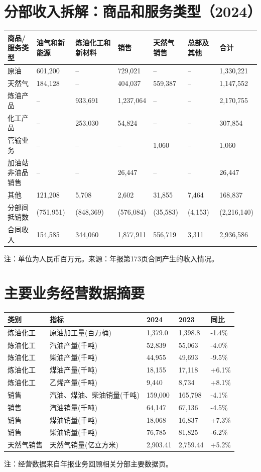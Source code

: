 \documentclass[9pt,a4paper]{ctexart}
\newcommand{\smallnote}[1]{{\scriptsize\color{Gray}#1}}
\begin{document}
\section{分部收入拆解：商品和服务类型（2024）}
\scriptsize
\begin{tabularx}{\textwidth}{@{}lYYYYYY@{}}
\toprule
商品/服务类型 & 油气和新能源 & 炼油化工和新材料 & 销售 & 天然气销售 & 总部及其他 & 合计 \\
\midrule
原油 & 601,200 & -- & 729,021 & -- & -- & 1,330,221 \\
天然气 & 184,128 & -- & 404,037 & 559,387 & -- & 1,147,552 \\
炼油产品 & -- & 933,691 & 1,237,064 & -- & -- & 2,170,755 \\
化工产品 & -- & 253,030 & 54,824 & -- & -- & 307,854 \\
管输业务 & -- & -- & -- & 1,060 & -- & 1,060 \\
加油站非油品销售 & -- & -- & 26,447 & -- & -- & 26,447 \\
其他 & 121,208 & 5,708 & 2,602 & 31,855 & 7,464 & 168,837 \\
分部间抵销数 & (751,951) & (848,369) & (576,084) & (35,583) & (4,153) & (2,216,140) \\
合同收入 & 154,585 & 344,060 & 1,877,911 & 556,719 & 3,311 & 2,936,586 \\
\bottomrule
\end{tabularx}
\normalsize
\smallnote{注：单位为人民币百万元。来源：年报第173页合同产生的收入情况。}

\section{主要业务经营数据摘要}
\scriptsize
\begin{tabularx}{\textwidth}{@{}l l Y Y Y@{}}
\toprule
类别 & 指标 & 2024 & 2023 & 同比 \\
\midrule
炼油化工 & 原油加工量(百万桶) & 1,379.0 & 1,398.8 & -1.4\% \\
炼油化工 & 汽油产量(千吨) & 52,839 & 55,063 & -4.0\% \\
炼油化工 & 柴油产量(千吨) & 44,955 & 49,693 & -9.5\% \\
炼油化工 & 煤油产量(千吨) & 18,155 & 17,118 & +6.1\% \\
炼油化工 & 乙烯产量(千吨) & 9,440 & 8,734 & +8.1\% \\
销售 & 汽油、煤油、柴油销量(千吨) & 159,000 & 165,798 & -4.1\% \\
销售 & 汽油销量(千吨) & 64,147 & 67,136 & -4.5\% \\
销售 & 煤油销量(千吨) & 18,068 & 16,837 & +7.3\% \\
销售 & 柴油销量(千吨) & 76,785 & 81,825 & -6.2\% \\
天然气销售 & 天然气销量(亿立方米) & 2,903.41 & 2,759.44 & +5.2\% \\
\bottomrule
\end{tabularx}
\normalsize
\smallnote{注：经营数据来自年报业务回顾相关分部主要数据页。}
\end{document}
